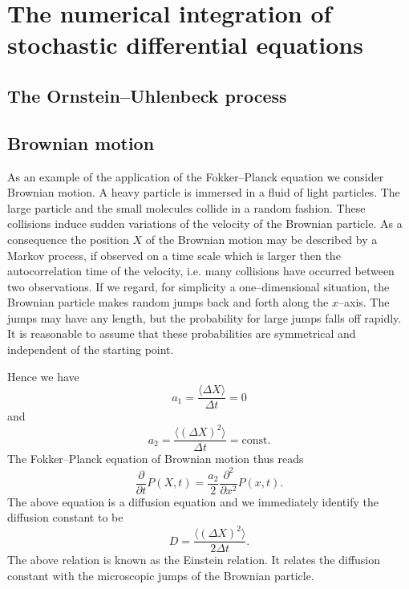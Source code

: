 \section{The numerical integration of stochastic differential 
equations}
\subsection{The Ornstein--Uhlenbeck process}






\subsection{Brownian motion}
As an example of the application of the Fokker--Planck
equation we consider Brownian motion. A heavy particle is immersed 
in a fluid of light particles. The large particle and the small 
molecules collide in a random fashion. These 
collisions induce sudden variations of the velocity of the 
Brownian particle. As a consequence the position $X$ of the Brownian 
motion may be described by a Markov 
process, if observed on a time scale which is larger then the 
autocorrelation time of the velocity, i.e. many collisions have 
occurred between two observations. If we regard, for simplicity a 
one--dimensional 
situation, the Brownian particle makes random jumps back and forth 
along the $x$--axis. The jumps may have any length, but the
probability for large jumps falls off rapidly. 
It is reasonable to assume that these probabilities are 
symmetrical and independent of the starting point.

Hence we have
\begin{equation*}
a_1 = \frac{\langle \Delta X \rangle}{\Delta t} = 0
\end{equation*}
and
\begin{equation}
a_2 = \frac{\langle (\Delta X)^2\rangle}{\Delta t}= \text{const}.
\end{equation}
The Fokker--Planck equation of Brownian motion thus reads
\begin{equation}
\label{BROWNIAN}
\frac{\partial}{\partial t} P(X,t) = \frac{a_2}{2} 
    \frac{\partial^2}{\partial x^2} P(x,t).
\end{equation}
The above equation is a diffusion equation and we immediately
identify the diffusion constant to be
\begin{equation}
D = \frac{\langle (\Delta X)^2\rangle}{2 \Delta t}.
\end{equation}
The above relation is known as the Einstein relation. It relates 
the diffusion constant with the microscopic jumps of the Brownian 
particle.

